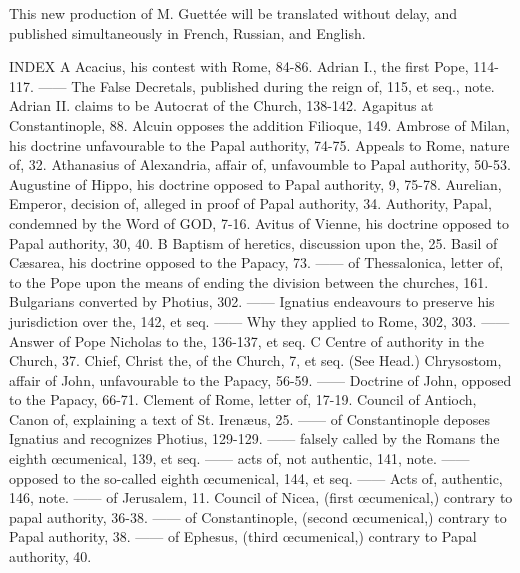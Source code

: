 This new production of M. Guettée will be translated without delay, and published simultaneously in French, Russian, and English.

INDEX A Acacius, his contest with Rome, 84-86. Adrian I., the first Pope, 114-117. —— The False Decretals, published during the reign of, 115, et seq., note. Adrian II. claims to be Autocrat of the Church, 138-142. Agapitus at Constantinople, 88. Alcuin opposes the addition Filioque, 149. Ambrose of Milan, his doctrine unfavourable to the Papal authority, 74-75. Appeals to Rome, nature of, 32. Athanasius of Alexandria, affair of, unfavoumble to Papal authority, 50-53. Augustine of Hippo, his doctrine opposed to Papal authority, 9, 75-78. Aurelian, Emperor, decision of, alleged in proof of Papal authority, 34. Authority, Papal, condemned by the Word of GOD, 7-16. Avitus of Vienne, his doctrine opposed to Papal authority, 30, 40. B Baptism of heretics, discussion upon the, 25. Basil of Cæsarea, his doctrine opposed to the Papacy, 73. —— of Thessalonica, letter of, to the Pope upon the means of ending the division between the churches, 161. Bulgarians converted by Photius, 302. —— Ignatius endeavours to preserve his jurisdiction over the, 142, et seq. —— Why they applied to Rome, 302, 303. —— Answer of Pope Nicholas to the, 136-137, et seq. C Centre of authority in the Church, 37. Chief, Christ the, of the Church, 7, et seq. (See Head.) Chrysostom, affair of John, unfavourable to the Papacy, 56-59. —— Doctrine of John, opposed to the Papacy, 66-71. Clement of Rome, letter of, 17-19. Council of Antioch, Canon of, explaining a text of St. Irenæus, 25. —— of Constantinople deposes Ignatius and recognizes Photius, 129-129. —— falsely called by the Romans the eighth œcumenical, 139, et seq. —— acts of, not authentic, 141, note. —— opposed to the so-called eighth œcumenical, 144, et seq. —— Acts of, authentic, 146, note. —— of Jerusalem, 11. Council of Nicea, (first œcumenical,) contrary to papal authority, 36-38. —— of Constantinople, (second œcumenical,) contrary to Papal authority, 38. —— of Ephesus, (third œcumenical,) contrary to Papal authority, 40.


